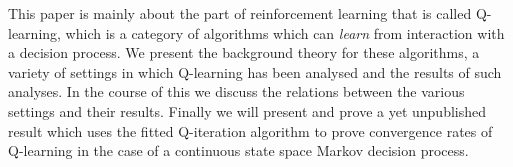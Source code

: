 
This paper is mainly about the part of reinforcement learning that is called
Q-learning, which is a category of algorithms which can \emph{learn} from
interaction with a decision process.
We present the background theory for these algorithms,
a variety of settings in which Q-learning has been analysed
and the results of such analyses.
In the course of this we discuss the relations between the various settings
and their results.
Finally we will present and prove a yet unpublished result
which uses the fitted Q-iteration algorithm to prove
convergence rates of Q-learning in the case of a
continuous state space Markov decision process.

